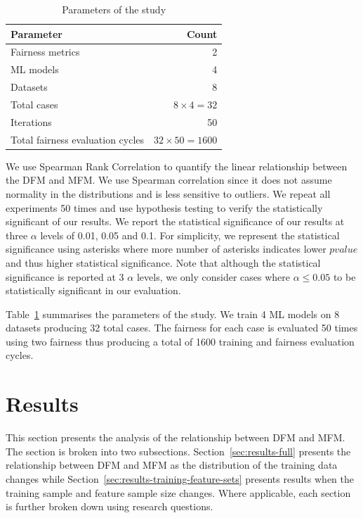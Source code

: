 \documentclass{article}
\begin{document}
\begin{table}
  \centering
  \begin{tabular}{lr}
    \toprule
    \textbf{Parameter} & \textbf{Count}\\
    \midrule
    Fairness metrics & 2\\
    ML models & 4\\
    Datasets & 8\\
    Total cases & $8\times4=32$\\
    Iterations & 50\\
    Total fairness evaluation cycles & $32\times50=1600$\\
    \bottomrule
  \end{tabular}
  \label{tab:parameters}
  \caption{Parameters of the study}
\end{table}

We use Spearman Rank Correlation to quantify the linear relationship
between the DFM and MFM. We use Spearman correlation since it does not
assume normality in the distributions and is less sensitive to
outliers. We repeat all experiments 50 times and use hypothesis
testing to verify the statistically significant of our results. We
report the statistical significance of our results at three $\alpha$
levels of 0.01, 0.05 and 0.1. For simplicity, we represent the
statistical significance using asterisks where more number of
asterisks indicates lower $pvalue$ and thus higher statistical
significance. Note that although the statistical significance is
reported at 3 $\alpha$ levels, we only consider cases where
$\alpha\le0.05$ to be statistically significant in our evaluation.

Table \ref{tab:parameters} summarises the parameters of the study. We
train 4 ML models on 8 datasets producing 32 total cases. The fairness
for each case is evaluated 50 times using two fairness thus producing
a total of 1600 training and fairness evaluation cycles.

\section{Results}\label{sec:results}

This section presents the analysis of the relationship between DFM and
MFM. The section is broken into two subsections.
Section \ref{sec:results-full} presents the relationship between DFM
and MFM as the distribution of the training data changes while
Section \ref{sec:results-training-feature-sets} presents results when
the training sample and feature sample size changes. Where applicable,
each section is further broken down using research questions.
\end{document}
